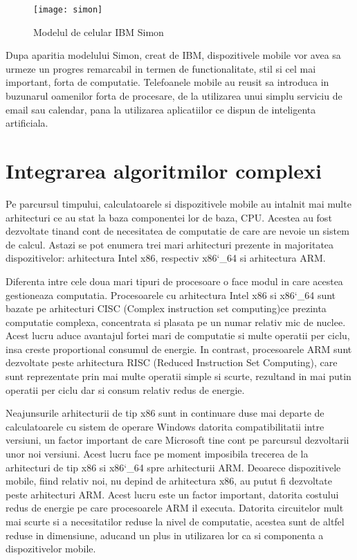 	
	
		\begin{figure}[H]
		\texttt{[image: simon]}  
		\caption{\label{fig:simon} Modelul de celular IBM Simon
			\protect
			\footnotemark}
	\end{figure}
	
	
	Dupa aparitia modelului Simon, creat de IBM, dispozitivele mobile vor avea sa urmeze un progres remarcabil in termen de functionalitate, stil si cel mai important, forta de computatie. 
	Telefoanele mobile au reusit sa introduca in buzunarul oamenilor forta de procesare, de la utilizarea unui simplu serviciu de email sau calendar, pana la utilizarea aplicatiilor ce dispun de inteligenta artificiala. \cite{history_cellphones}
	\newline
	
	\section{Integrarea algoritmilor complexi}
	Pe parcursul timpului, calculatoarele si dispozitivele mobile au intalnit mai multe arhitecturi ce au stat la baza componentei lor de baza, CPU. Acestea au fost dezvoltate tinand cont de necesitatea de computatie de care are nevoie un sistem de calcul. Astazi se pot enumera trei mari arhitecturi prezente in majoritatea dispozitivelor: arhitectura Intel x86, respectiv x86\char`_64 si arhitectura ARM. 
	
	Diferenta intre cele doua mari tipuri de procesoare o face modul in care acestea gestioneaza computatia. Procesoarele cu arhitectura Intel x86 si x86\char`_64 sunt bazate pe arhitecturi CISC (Complex instruction set computing)ce prezinta computatie complexa, concentrata si plasata pe un numar relativ mic de nuclee. Acest lucru aduce avantajul fortei mari de computatie si multe operatii per ciclu, insa creste proportional consumul de energie. In contrast, procesoarele ARM sunt dezvoltate peste arhitectura RISC (Reduced Instruction Set Computing), care sunt reprezentate prin mai multe operatii simple si scurte, rezultand in mai putin operatii per ciclu dar si consum relativ redus de energie. 
	
	Neajunsurile arhitecturii de tip x86 sunt in continuare duse mai departe de calculatoarele cu sistem de operare Windows datorita compatibilitatii intre versiuni, un factor important de care Microsoft tine cont pe parcursul dezvoltarii unor noi versiuni. Acest lucru face pe moment imposibila trecerea de la arhitecturi de tip x86 si x86\char`_64 spre arhitecturii ARM. Deoarece dispozitivele mobile, fiind relativ noi, nu depind de arhitectura x86, au putut fi dezvoltate peste arhitecturi ARM. Acest lucru este un factor important, datorita costului redus de energie pe care procesoarele ARM il executa. Datorita circuitelor mult mai scurte si a necesitatilor reduse la nivel de computatie, acestea sunt de altfel reduse in dimensiune, aducand un plus in utilizarea lor ca si componenta a dispozitivelor mobile. 
	
